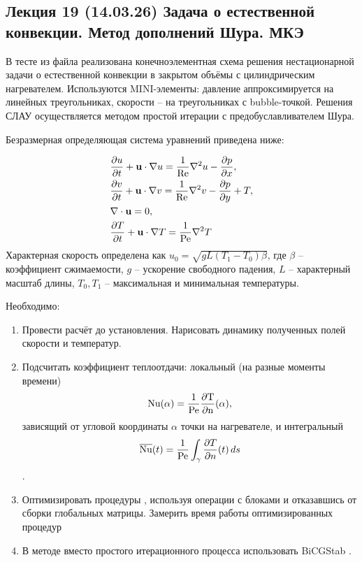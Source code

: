 \subsection{Лекция 19 (14.03.26) Задача о естественной конвекции. Метод дополнений Шура. МКЭ}
В тесте  из файла 
реализована конечноэлементная схема решения нестационарной задачи о естественной
конвекции в закрытом объёмы с цилиндрическим нагревателем.
Используются MINI-элементы:
давление аппроксимируется на линейных треугольниках,
скорости -- на треугольниках с bubble-точкой.
Решения СЛАУ осуществляется методом простой
итерации с предобуславливателем Шура.

Безразмерная определяющая система уравнений приведена ниже:

\begin{equation}
\label{eq:natural_convection_y}
\begin{aligned}
& \frac{\partial u}{\partial t} + \boldsymbol{\rm u}\cdot\nabla u = \frac{1}{\mathrm{Re}} \nabla^2 u - \frac{\partial p}{\partial x}, \\
& \frac{\partial v}{\partial t} + \boldsymbol{\rm u}\cdot\nabla v = \frac{1}{\mathrm{Re}} \nabla^2 v - \frac{\partial p}{\partial y} + T, \\
& \nabla \cdot \boldsymbol{\rm u} = 0, \\
& \frac{\partial T}{\partial t} + \boldsymbol{\rm u}\cdot\nabla T = \frac{1}{\mathrm{Pe}} \nabla^2 T
\end{aligned}
\end{equation}
Характерная скорость определена как
$u_0 = \sqrt{gL(T_1 - T_0) \beta}$, где $\beta$ -- коэффициент сжимаемости, $g$ -- ускорение свободного падения, $L$ -- характерный масштаб длины, $T_0, T_1$ -- максимальная и минимальная температуры.

Необходимо:
\begin{enumerate}
\item  Провести расчёт до установления. Нарисовать динамику полученных полей скорости и температур.
\item  Подсчитать коэффициент теплоотдачи: локальный  (на разные моменты времени)
       $$\rm Nu(\alpha) = \frac{1}{\rm Pe} \frac{\partial T}{\partial n} (\alpha),$$
       зависящий от угловой координаты $\alpha$ точки на нагревателе,
       и интегральный
       $$\overline{\rm Nu}(t) = \frac{1}{\rm Pe} \int_{\gamma}\frac{\partial T}{\partial n}(t)\, ds$$.
\item  Оптимизировать процедуры , 
       используя операции с блоками и отказавшись от сборки глобальных матрицы. Замерить время работы оптимизированных процедур
\item  В методе  вместо простого итерационного процесса  использовать BiCGStab .
\end{enumerate}

